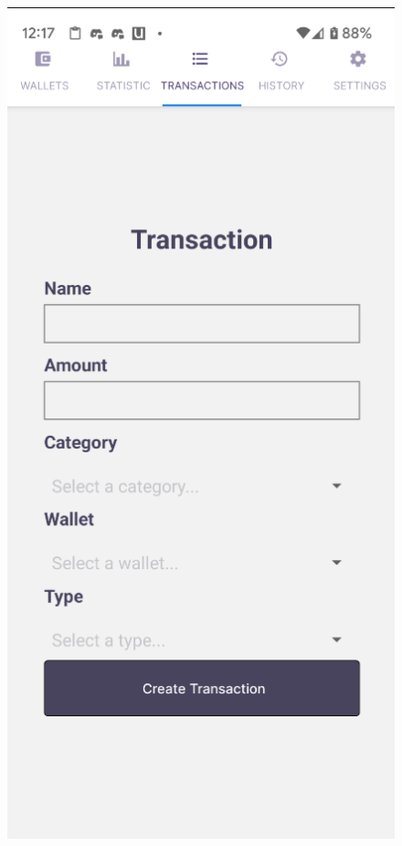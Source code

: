 \begin{figure}[htbp]
    \centering
    \begin{minipage}[t]{0.2\textwidth}
        \centering
        \includegraphics[width=\textwidth]{Screen Shots/Moneager/TransanctionCreatorScreen.png}

\end{minipage}
\end{figure}
